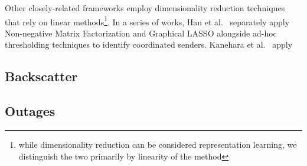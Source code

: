 \documentclass[manuscript,nonacm]{acmart}
\begin{document}
Other closely-related frameworks employ dimensionality reduction techniques that rely on linear methods\footnote{while dimensionality reduction can be considered representation learning, we distinguish the two primarily by linearity of the method}.
In a series of works, Han et al.~\cite{@@} separately apply Non-negative Matrix Factorization and Graphical LASSO alongside ad-hoc thresholding techniques to identify coordinated senders.
Kanehara et al.~\cite{@@} apply 





\vspace{0.25em}


\subsection{Backscatter}

\subsection{Outages}



\end{document}
